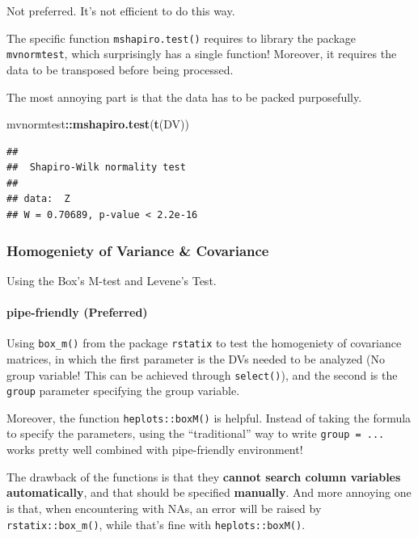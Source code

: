 \documentclass[
]{ctexart}
\newenvironment{Shaded}{\begin{snugshade}}{\end{snugshade}}
\newcommand{\FunctionTok}[1]{\textcolor[rgb]{0.13,0.29,0.53}{\textbf{#1}}}
\newcommand{\NormalTok}[1]{#1}
\newcommand{\SpecialCharTok}[1]{\textcolor[rgb]{0.81,0.36,0.00}{\textbf{#1}}}
\begin{document}
Not preferred. It's not efficient to do this way.

The specific function \texttt{mshapiro.test()} requires to library the
package \texttt{mvnormtest}, which surprisingly has a single function!
Moreover, it requires the data to be transposed before being processed.

The most annoying part is that the data has to be packed purposefully.

\begin{Shaded}
\begin{Highlighting}[]
\NormalTok{mvnormtest}\SpecialCharTok{::}\FunctionTok{mshapiro.test}\NormalTok{(}\FunctionTok{t}\NormalTok{(DV))}
\end{Highlighting}
\end{Shaded}

\begin{verbatim}
## 
##  Shapiro-Wilk normality test
## 
## data:  Z
## W = 0.70689, p-value < 2.2e-16
\end{verbatim}

\hypertarget{homogeniety-of-variance-covariance}{%
\subsubsection{Homogeniety of Variance \&
Covariance}\label{homogeniety-of-variance-covariance}}

Using the Box's M-test and Levene's Test.

\hypertarget{pipe-friendly-preferred-1}{%
\paragraph{pipe-friendly (Preferred)}\label{pipe-friendly-preferred-1}}

Using \texttt{box\_m()} from the package \texttt{rstatix} to test the
homogeniety of covariance matrices, in which the first parameter is the
DVs needed to be analyzed (No group variable! This can be achieved
through \texttt{select()}), and the second is the \texttt{group}
parameter specifying the group variable.

Moreover, the function \texttt{heplots::boxM()} is helpful. Instead of
taking the formula to specify the parameters, using the ``traditional''
way to write \texttt{group\ =\ ...} works pretty well combined with
pipe-friendly environment!

The drawback of the functions is that they \textbf{cannot search column
variables automatically}, and that should be specified
\textbf{manually}. And more annoying one is that, when encountering with
NAs, an error will be raised by \texttt{rstatix::box\_m()}, while that's
fine with \texttt{heplots::boxM()}.
\end{document}
